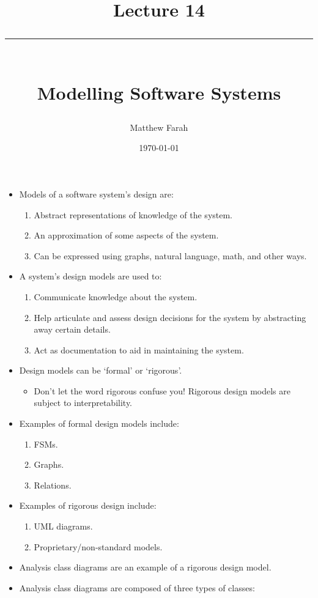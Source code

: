 \documentclass{article}
\date{
	\vspace{-.75em}
	{\large \today}
}
\title{
	\vspace*{-1.5em}
	{\Huge Lecture 14} \\
	\vspace{-1em}
	\rule{\textwidth/4}{.01em} \\
	\vspace{-.25em}
	{\Large Modelling Software Systems}
	\vspace{-.75em}
}
\author{
	{\large Matthew Farah}
}
\begin{document}
\maketitle
\pagestyle{fancy}

\fi

\begin{itemize}
	\item Models of a software system's design are:
	\begin{enumerate}
		\item Abstract representations of knowledge of the system.
		\item An approximation of some aspects of the system.
		\item Can be expressed using graphs, natural language, math, and other ways.
	\end{enumerate}
	\item A system's design models are used to:
	\begin{enumerate}
		\item Communicate knowledge about the system.
		\item Help articulate and assess design decisions for the system by abstracting away certain details.
		\item Act as documentation to aid in maintaining the system.
	\end{enumerate}
	\item Design models can be `formal' or `rigorous'.
	\begin{itemize}
		\item Don't let the word rigorous confuse you! Rigorous design models are subject to interpretability.
	\end{itemize}
	\item Examples of formal design models include:
	\begin{enumerate}
		\item FSMs.
		\item Graphs.
		\item Relations.
	\end{enumerate}
	\item Examples of rigorous design include:
	\begin{enumerate}
		\item UML diagrams.
		\item Proprietary/non-standard models.
	\end{enumerate}
	\item Analysis class diagrams are an example of a rigorous design model.
	\item Analysis class diagrams are composed of three types of classes:

\end{itemize}
\end{document}
